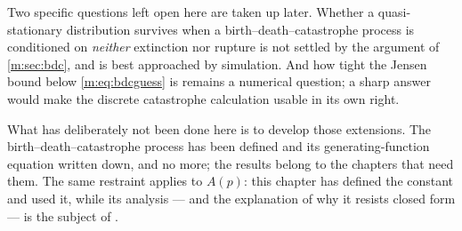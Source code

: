 Two specific questions left open here are taken up later. Whether a
quasi-stationary distribution survives when a birth--death--catastrophe process is
conditioned on \emph{neither} extinction nor rupture is not settled by the
argument of \cref{m:sec:bdc}, and is best approached by simulation. And how tight
the Jensen bound below \cref{m:eq:bdcguess} is remains a numerical question; a
sharp answer would make the discrete catastrophe calculation usable in its own
right.

What has deliberately not been done here is to develop those extensions. The
birth--death--catastrophe process has been defined and its generating-function
equation written down, and no more; the results belong to the chapters that need
them. The same restraint applies to $A(p)$: this chapter has defined the constant
and used it, while its analysis --- and the explanation of why it resists closed
form --- is the subject of \ChA.
